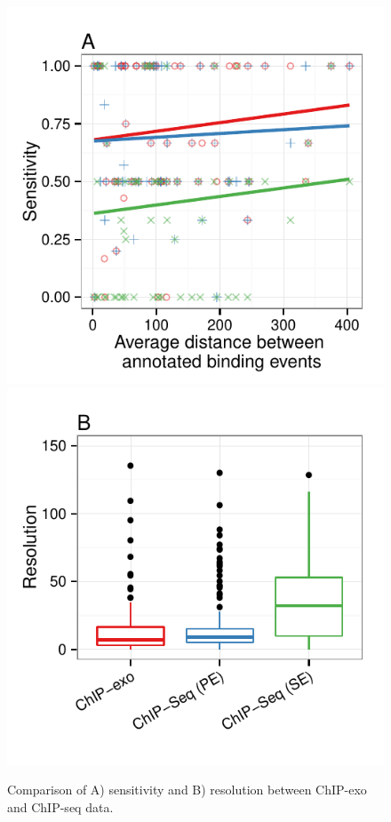 \documentclass{bmcart}
\begin{document}
\begin{figure}[h!]
  \centering
  \includegraphics[width = .46\textwidth]{figures/fig8/sensitivity_exo_olda_data.pdf}
  \includegraphics[width = .46\textwidth]{figures/fig8/resolution_by_dataset_old_data.pdf}
  \caption{Comparison of A) sensitivity and B) resolution between
    ChIP-exo and ChIP-seq data.}
  \label{fig:8}
\end{figure}
\end{document}
